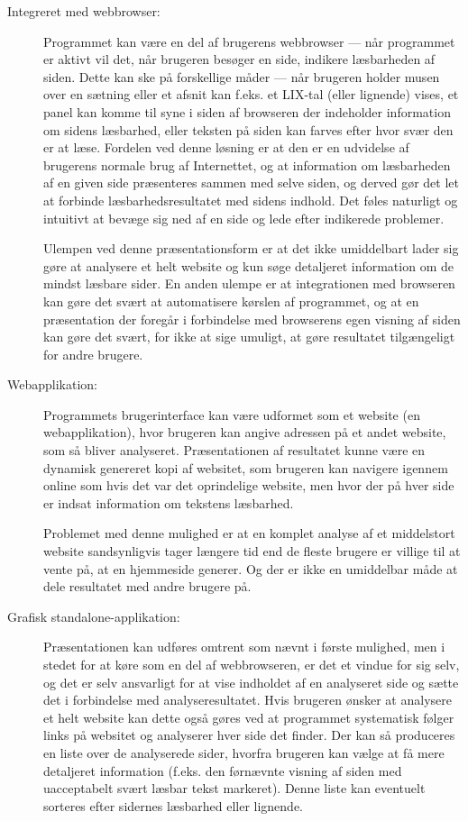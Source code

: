 \documentclass[a4paper,oneside]{memoir}
\begin{document}
\begin{description}
\item[Integreret med webbrowser:]
  Programmet kan være en del af brugerens webbrowser --- når
  programmet er aktivt vil det, når brugeren besøger en side, indikere
  læsbarheden af siden. Dette kan ske på forskellige måder --- når
  brugeren holder musen over en sætning eller et afsnit kan f.eks. et
  LIX-tal (eller lignende) vises, et panel kan komme til syne i siden
  af browseren der indeholder information om sidens læsbarhed, eller
  teksten på siden kan farves efter hvor svær den er at læse. Fordelen
  ved denne løsning er at den er en udvidelse af brugerens normale
  brug af Internettet, og at information om læsbarheden af en given
  side præsenteres sammen med selve siden, og derved gør det let at
  forbinde læsbarhedsresultatet med sidens indhold. Det føles
  naturligt og intuitivt at bevæge sig ned af en side og lede efter
  indikerede problemer. 

  Ulempen ved denne præsentationsform er at det ikke umiddelbart lader
  sig gøre at analysere et helt website og kun søge detaljeret
  information om de mindst læsbare sider. En anden ulempe er at
  integrationen med browseren kan gøre det svært at automatisere
  kørslen af programmet, og at en præsentation der foregår i
  forbindelse med browserens egen visning af siden kan gøre det svært,
  for ikke at sige umuligt, at gøre resultatet tilgængeligt for andre
  brugere.

\item[Webapplikation:]
  Programmets brugerinterface kan være udformet som et website (en
  webapplikation), hvor brugeren kan angive adressen på et andet
  website, som så bliver analyseret. Præsentationen af resultatet
  kunne være en dynamisk genereret kopi af websitet, som brugeren kan
  navigere igennem online som hvis det var det oprindelige website,
  men hvor der på hver side er indsat information om tekstens
  læsbarhed. 

  Problemet med denne mulighed er at en komplet analyse af et
  middelstort website sandsynligvis tager længere tid end de fleste
  brugere er villige til at vente på, at en hjemmeside generer. Og der er ikke
  en umiddelbar måde at dele resultatet med andre brugere på.

\item[Grafisk standalone-applikation:] 
  Præsentationen kan udføres omtrent som nævnt i første mulighed, men
  i stedet for at køre som en del af webbrowseren, er det et vindue
  for sig selv, og det er selv ansvarligt for at vise indholdet af en
  analyseret side og sætte det i forbindelse med
  analyseresultatet. Hvis brugeren ønsker at analysere et helt website
  kan dette også gøres ved at programmet systematisk følger links på
  websitet og analyserer hver side det finder. Der kan så produceres
  en liste over de analyserede sider, hvorfra brugeren kan vælge at få
  mere detaljeret information (f.eks. den førnævnte visning af siden
  med uacceptabelt svært læsbar tekst markeret). Denne liste kan
  eventuelt sorteres efter sidernes læsbarhed eller lignende.


\end{description}
\end{document}
